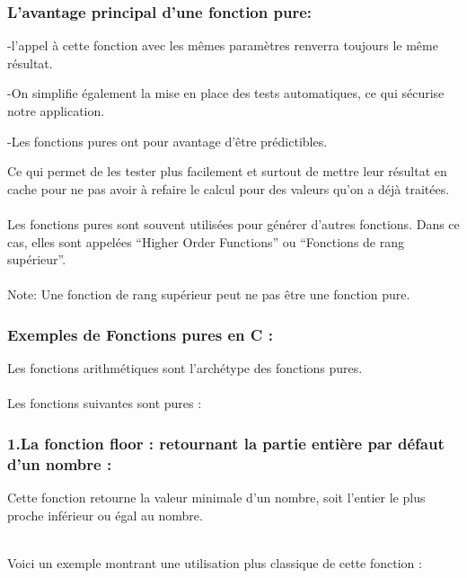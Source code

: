 \documentclass[12pt,titlepage]{report}
\begin{document}
\subsubsection{L’avantage principal d'une fonction pure:}

-l'appel à cette fonction avec les mêmes paramètres renverra toujours le même résultat.

-On simplifie également la mise en place des tests automatiques, ce qui sécurise notre application.

-Les fonctions pures ont pour avantage d’être prédictibles.

Ce qui permet de les tester plus facilement et surtout de mettre leur résultat en cache pour ne pas avoir à refaire le calcul pour des valeurs qu’on a déjà traitées.\\

\\Les fonctions pures sont souvent utilisées pour générer d’autres fonctions. Dans ce cas, elles sont appelées “Higher Order Functions” ou “Fonctions de rang supérieur”.\\

\\Note: Une fonction de rang supérieur peut ne pas être une fonction pure.\\



\subsubsection{Exemples de Fonctions pures en C :}

Les fonctions arithmétiques sont l'archétype des fonctions pures.\\

\\Les fonctions  suivantes sont pures :



\subsubsection{1.La fonction floor : retournant la partie entière par défaut d'un nombre :}

Cette fonction retourne la valeur minimale d'un nombre, soit l'entier le plus proche inférieur ou égal au nombre.

\\Voici un exemple montrant une utilisation plus classique de cette fonction :\\
\end{document}
